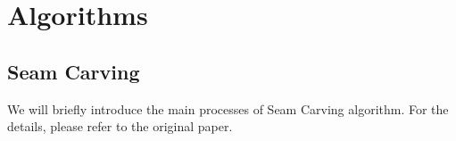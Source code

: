 
\section{Algorithms}

\subsection{Seam Carving}
We will briefly introduce the main processes of Seam Carving algorithm. For the details,
please refer to the original paper\cite{sc}.
